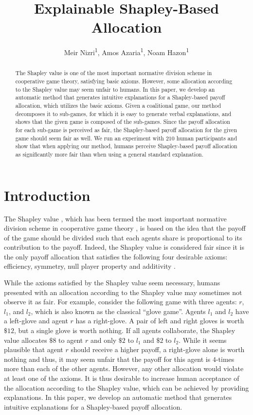 \documentclass[letterpaper]{article}
\title{Explainable Shapley-Based Allocation}
\author {
Meir Nizri\textsuperscript{\rm 1},
Amos Azaria\textsuperscript{\rm 1},
Noam Hazon\textsuperscript{\rm 1}
}
\begin{document}
\maketitle


\begin{abstract}
The Shapley value is one of the most important normative division scheme in cooperative game theory, satisfying basic axioms. However, some allocation according to the Shapley value may seem unfair to humans.
In this paper, we develop an automatic method that generates intuitive explanations for a Shapley-based payoff allocation, which utilizes the basic axioms.
Given a coalitional game, our method decomposes it to sub-games, for which it is easy to generate verbal explanations, and shows that the given game is composed of the sub-games.
Since the payoff allocation for each sub-game is perceived as fair, the Shapley-based payoff allocation for the given game should seem fair as well.
We run an experiment with $210$ human participants and show that when applying our method, humans perceive Shapley-based payoff allocation as significantly more fair than when using a general standard explanation.
\end{abstract}




\section{Introduction}

The Shapley value \cite{shapley1953value}, which has been termed the most important normative division scheme in cooperative game theory \cite{winter2002shapley},
is based on the idea that the payoff of the game should be divided such that each agents share is proportional to its contribution to the payoff.
Indeed, the Shapley value is considered fair since it is the only payoff allocation that satisfies the following four desirable axioms: efficiency, symmetry, null player property and additivity \cite{hart1989shapley}. %

While the axioms satisfied by the Shapley value seem necessary, humans presented with an allocation according to the Shapley value may sometimes not observe it as fair. For example, consider the following game with three agents: $r$, $l_1$, and $l_2$, which is also known as the classical ``glove game''. Agents $l_1$ and $l_2$ have a left-glove and agent $r$ has a right-glove. A pair of left and right gloves is worth $\$12$, but a single glove is worth nothing. If all agents collaborate, the Shapley value allocates $\$8$ to agent $r$ and only $\$2$ to $l_1$ and $\$2$ to $l_2$. While it seems plausible that agent $r$ should receive a higher payoff, a right-glove alone is worth nothing and thus, it may seem unfair that the payoff for this agent is $4$-times more than each of the other agents. However, any other allocation would violate at least one of the axioms. It is thus desirable to increase human acceptance of the allocation according to the Shapley value, which can be achieved by providing explanations.
In this paper, we develop an automatic method that generates intuitive explanations for a Shapley-based payoff allocation.
\end{document}
